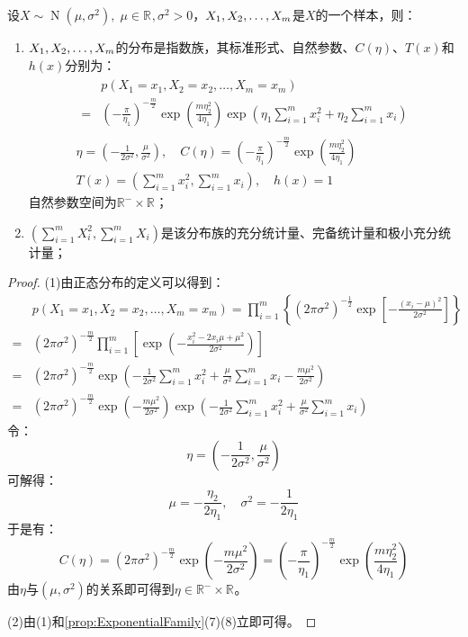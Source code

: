 \begin{theorem}
	设$X\sim\operatorname{N}(\mu,\sigma^2),\;\mu\in\mathbb{R}^{},\sigma^2>0$，$X_1, X_2, \dots, X_{m}$是$X$的一个样本，则：
	\begin{enumerate}
		\item $X_1, X_2, \dots, X_{m}$的分布是指数族，其标准形式、自然参数、$C(\eta)$、$T(x)$和$h(x)$分别为：
		\begin{gather*}
			\begin{aligned}
				&p(X_1=x_1,X_2=x_2,\dots,X_m=x_m) \\
				=&\left(-\frac{\pi}{\eta_1}\right)^{-\frac{m}{2}}\exp\left(\frac{m\eta_2^2}{4\eta_1}\right)\exp\left(\eta_1\sum_{i=1}^{m}x_i^2+\eta_2\sum_{i=1}^{m}x_i\right)
			\end{aligned} \\
			\eta=\left(-\frac{1}{2\sigma^2},\frac{\mu}{\sigma^2}\right),\quad C(\eta)=\left(-\frac{\pi}{\eta_1}\right)^{-\frac{m}{2}}\exp\left(\frac{m\eta_2^2}{4\eta_1}\right) \\
			T(x)=\left(\sum_{i=1}^{m}x_i^2,\sum_{i=1}^{m}x_i\right),\quad h(x)=1
		\end{gather*}
		自然参数空间为$\mathbb{R}^-\times\mathbb{R}^{}$；
		\item $\left(\sum\limits_{i=1}^{m}X_i^2,\sum\limits_{i=1}^{m}X_i\right)$是该分布族的充分统计量、完备统计量和极小充分统计量；
	\end{enumerate}
\end{theorem}
\begin{proof}
	(1)由正态分布的定义可以得到：
	\begin{align*}
		&p(X_1=x_1,X_2=x_2,\dots,X_m=x_m)=\prod_{i=1}^{m}\left\{(2\pi\sigma^2)^{-\frac{1}{2}}\exp\left[-\frac{(x_i-\mu)^2}{2\sigma^2}\right]\right\} \\
		=&(2\pi\sigma^2)^{-\frac{m}{2}}\prod_{i=1}^{m}\left[\exp\left(-\frac{x_i^2-2x_i\mu+\mu^2}{2\sigma^2}\right)\right] \\
		=&(2\pi\sigma^2)^{-\frac{m}{2}}\exp\left(-\frac{1}{2\sigma^2}\sum_{i=1}^{m}x_i^2+\frac{\mu}{\sigma^2}\sum_{i=1}^{m}x_i-\frac{m\mu^2}{2\sigma^2}\right) \\
		=&(2\pi\sigma^2)^{-\frac{m}{2}}\exp\left(-\frac{m\mu^2}{2\sigma^2}\right)\exp\left(-\frac{1}{2\sigma^2}\sum_{i=1}^{m}x_i^2+\frac{\mu}{\sigma^2}\sum_{i=1}^{m}x_i\right)
	\end{align*}
	令：
	\begin{equation*}
		\eta=\left(-\frac{1}{2\sigma^2},\frac{\mu}{\sigma^2}\right)
	\end{equation*}
	可解得：
	\begin{equation*}
		\mu=-\frac{\eta_2}{2\eta_1},\quad\sigma^2=-\frac{1}{2\eta_1}
	\end{equation*}
	于是有：
	\begin{equation*}
		C(\eta)=(2\pi\sigma^2)^{-\frac{m}{2}}\exp\left(-\frac{m\mu^2}{2\sigma^2}\right)=\left(-\frac{\pi}{\eta_1}\right)^{-\frac{m}{2}}\exp\left(\frac{m\eta_2^2}{4\eta_1}\right)
	\end{equation*}
	由$\eta$与$(\mu,\sigma^2)$的关系即可得到$\eta\in\mathbb{R}^{-}\times\mathbb{R}^{}$。\par
	(2)由(1)和\cref{prop:ExponentialFamily}(7)(8)立即可得。
\end{proof}

